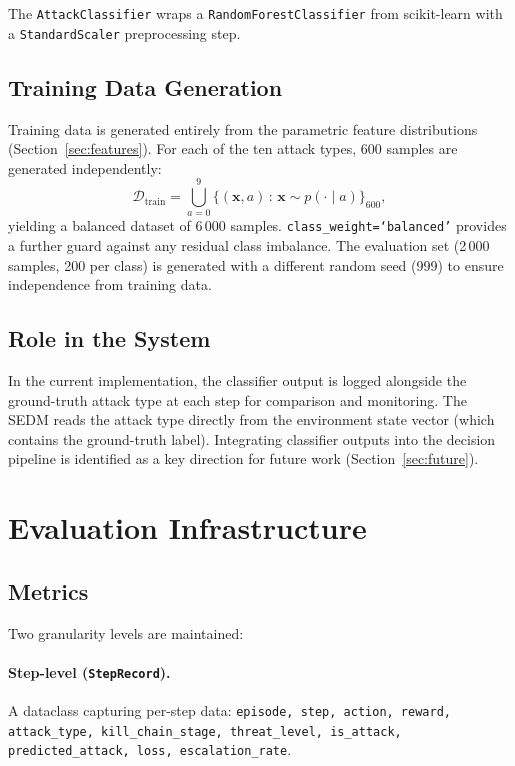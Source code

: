 The \texttt{AttackClassifier} wraps a \texttt{RandomForestClassifier} from
scikit-learn with a \texttt{StandardScaler} preprocessing step.

\subsection{Training Data Generation}

Training data is generated entirely from the parametric feature distributions
(Section~\ref{sec:features}).
For each of the ten attack types, 600 samples are generated independently:
%
\begin{equation}
  \mathcal{D}_{\text{train}} = \bigcup_{a=0}^{9}
  \bigl\{(\mathbf{x}, a) \,:\, \mathbf{x} \sim p(\cdot \mid a)\bigr\}_{600},
\end{equation}
%
yielding a balanced dataset of 6\,000 samples.
\texttt{class\_weight=`balanced'} provides a further guard against any
residual class imbalance.
The evaluation set (2\,000 samples, 200 per class) is generated with a
different random seed (999) to ensure independence from training data.

\subsection{Role in the System}

In the current implementation, the classifier output is logged alongside
the ground-truth attack type at each step for comparison and monitoring.
The SEDM reads the attack type directly from the environment state vector
(which contains the ground-truth label).
Integrating classifier outputs into the decision pipeline is identified as
a key direction for future work (Section~\ref{sec:future}).

\section{Evaluation Infrastructure}
\label{sec:eval_infra}

\subsection{Metrics}

Two granularity levels are maintained:

\paragraph{Step-level (\texttt{StepRecord}).}
A dataclass capturing per-step data:
\texttt{episode, step, action, reward, attack\_type, kill\_chain\_stage,
threat\_level, is\_attack, predicted\_attack, loss, escalation\_rate}.

